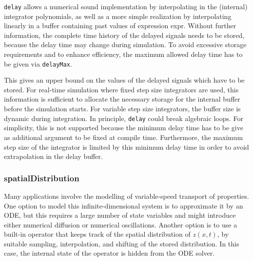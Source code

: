 \begin{nonnormative}
\lstinline!delay! allows a numerical sound
implementation by interpolating in the (internal) integrator
polynomials, as well as a more simple realization by interpolating
linearly in a buffer containing past values of expression expr. Without
further information, the complete time history of the delayed signals
needs to be stored, because the delay time may change during simulation.
To avoid excessive storage requirements and to enhance efficiency, the
maximum allowed delay time has to be given via \lstinline!delayMax!.

This gives an upper bound on the values of the delayed signals
which have to be stored. For real-time simulation where fixed step size
integrators are used, this information is sufficient to allocate the
necessary storage for the internal buffer before the simulation starts.
For variable step size integrators, the buffer size is dynamic during
integration. In principle, \lstinline!delay! could break algebraic
loops. For simplicity, this is not supported because the minimum delay
time has to be give as additional argument to be fixed at compile time.
Furthermore, the maximum step size of the integrator is limited by this
minimum delay time in order to avoid extrapolation in the delay
buffer.
\end{nonnormative}

\subsubsection{spatialDistribution}

\begin{nonnormative}
Many applications involve the modelling of variable-speed
transport of properties. One option to model this infinite-dimensional
system is to approximate it by an ODE, but this requires a large number
of state variables and might introduce either numerical diffusion or
numerical oscillations. Another option is to use a built-in operator
that keeps track of the spatial distribution of $z(x, t)$, by suitable
sampling, interpolation, and shifting of the stored distribution. In
this case, the internal state of the operator is hidden from the ODE
solver.
\end{nonnormative}

